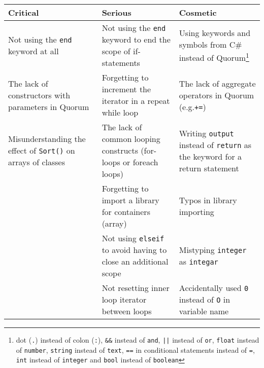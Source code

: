 \documentclass[preprint,10pt]{sigplanconf}
\begin{document}
\begin{table*}[]
\renewcommand{\arraystretch}{1.5}
\begin{minipage}[c]{\textwidth}
\begin{center}
\begin{tabular}{| p{5cm} | p{5cm} | p{5cm} |}
\hline
\textbf{Critical}                                          & \textbf{Serious}                                                   & \textbf{Cosmetic}                                                                                        \\ \hline
Not using the \lstinline!end! keyword at all               & Not using the \lstinline!end! keyword to end the scope of if-statements      & Using keywords and symbols from C\# instead of Quorum\footnote{dot (\lstinline!.!) instead of colon (\lstinline!:!), \lstinline!&&! instead of \lstinline!and!, \lstinline!||! instead of \lstinline!or!, \lstinline!float! instead of \lstinline!number!, \lstinline!string! instead of \lstinline!text!, \lstinline!==! in conditional statements instead of \lstinline!=!, \lstinline!int! instead of \lstinline!integer! and \lstinline!bool! instead of \lstinline!boolean!} \\ \hline
The lack of constructors with parameters in Quorum         & Forgetting to increment the iterator in a repeat while loop        & The lack of aggregate operators in Quorum (e.g.\lstinline!+=!)                                           \\ \hline
Misunderstanding the effect of \lstinline!Sort()! on arrays of classes & The lack of common looping constructs (for-loops or foreach loops) &  Writing \lstinline!output! instead of \lstinline!return! as the keyword for a return statement \\ \hline
                                                           & Forgetting to import a library for containers (array)              & Typos in library importing                                                					           \\ \hline
                                                           & Not using \lstinline!elseif! to avoid having to close an additional scope    & Mistyping \lstinline!integer! as \lstinline!integar!                                 \\ \hline
                                                           & Not resetting inner loop iterator between loops                    & Accidentally used \lstinline!0! instead of \lstinline!O! in variable name						           \\ \hline

\end{tabular}
\end{center}
\end{minipage}
\end{table*}
\end{document}

